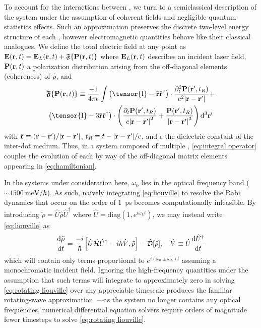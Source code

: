To account for the interactions between \qds{}, we turn to a semiclassical description of the system under the assumption of coherent fields and negligible quantum  statistics effects.
Such an approximation preserves the discrete two-level energy structure of each \qd{}, however electromagnetic quantities behave like their classical analogues.
We define the total electric field at any point as $\vb{E}(\vb{r}, t) = \vb{E}_L(\vb{r}, t) + \mathfrak{F}\{ \vb{P}(\vb{r}, t) \}$
where $\vb{E}_L(\vb{r}, t)$ describes an incident laser field, $\vb{P}(\vb{r}, t)$ a polarization distribution arising from  the off-diagonal elements (coherences) of $\hat{\rho}$, and
\begin{equation}
  \begin{gathered}
    \mathfrak{F}\{\vb{P}(\vb{r}, t)\} \equiv
      \frac{-1}{4\pi \epsilon} \int
      \left(\tensor{\mathrm{I}} -  \bar{\mathbf{r}}\bar{\mathbf{r}}^\dagger\right) \cdot \frac{\partial_t^2 \mathbf{P}(\mathbf{r}', t_R)}{c^2 \abs{\mathbf{r}-\mathbf{r}'}} + \\
      \left(\tensor{\mathrm{I}} - 3\bar{\mathbf{r}}\bar{\mathbf{r}}^\dagger\right) \cdot \qty(
        \frac{\partial_t   \mathbf{P}(\mathbf{r}', t_R)}{c \abs{\mathbf{r}-\mathbf{r}'}^2} +
        \frac{             \mathbf{P}(\mathbf{r}', t_R)}{  \abs{\mathbf{r}-\mathbf{r}'}^3}
      )
    \, \mathrm{d}^3 \mathbf{r'}
  \end{gathered}
  \label{eq:integral operator}
\end{equation}
with $\bar{\vb{r}} \equiv \qty(\vb{r} - \vb{r}')/\abs{\vb{r} - \vb{r}'}$, $t_R \equiv t - \abs{\vb{r} - \vb{r}'}/c$, and $\epsilon$ the  dielectric constant of the inter-dot medium.
Thus, in a system composed of multiple \qds{}, \cref{eq:integral operator} couples the evolution of each \qd{} by way of the off-diagonal matrix elements appearing in \cref{eq:hamiltonian}.

In the systems under consideration here, $\omega_0$ lies in the optical frequency band ($\sim \SI{1500}{\milli\eV\per\hbar}$).
As such, na\"ively integrating \cref{eq:liouville} to resolve the Rabi dynamics that occur on the order of \SI{1}{\pico\second} becomes computationally infeasible.
By introducing $\tilde{\rho} = \hat{U} \hat{\rho} \hat{U}^\dagger$ where $\hat{U} = \mathrm{diag}(1, e^{i \omega_L t})$, we may instead write \cref{eq:liouville} as
\begin{equation}
  \dv{\tilde{\rho}}{t} = \frac{-i}{\hbar} \commutator{\hat{U} \hat{\mathcal{H}} \hat{U}^\dagger - i \hbar \hat{V}}{\tilde{\rho}} - \hat{\mathcal{D}}\qty[\tilde{\rho}], \quad \hat{V} \equiv \hat{U} \dv{\hat{U}^\dagger}{t}
  \label{eq:rotating liouville}
\end{equation}
which will contain only terms proportional to $e^{i (\omega_0 \pm \omega_L) t}$ assuming a monochromatic incident field.
Ignoring the high-frequency quantities under the assumption that such terms will integrate to approximately zero in solving \cref{eq:rotating liouville} over any appreciable timescale produces the familiar rotating-wave approximation~\cite{Allen1975}---as the system no longer contains any optical frequencies, numerical differential equation solvers require orders of magnitude fewer timesteps to solve \cref{eq:rotating liouville}.

